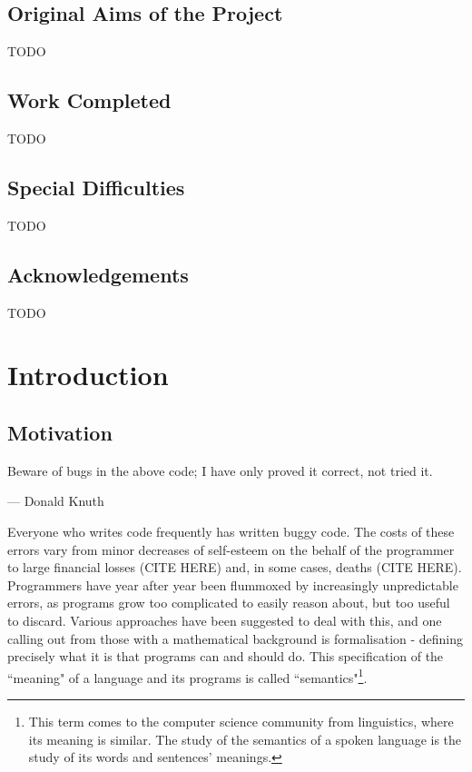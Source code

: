 \documentclass[12pt,a4paper,twoside,openright]{report}
\begin{document}
\section*{Original Aims of the Project}

TODO


\section*{Work Completed}

TODO

\section*{Special Difficulties}

TODO

\newpage

\tableofcontents

\listoffigures

\newpage
\section*{Acknowledgements}

TODO


\pagestyle{headings}
\chapter{Introduction}
\section{Motivation}
\epigraph{Beware of bugs in the above code; I have only proved it correct, not tried it.}{--- \textup{Donald Knuth}}

Everyone who writes code frequently has written buggy code. The costs of these errors vary from minor decreases of self-esteem on the behalf of the programmer to large financial losses (CITE HERE) and, in some cases, deaths (CITE HERE). Programmers have year after year been flummoxed by increasingly unpredictable errors, as programs grow too complicated to easily reason about, but too useful to discard. Various approaches have been suggested to deal with this, and one calling out from those with a mathematical background is formalisation - defining precisely what it is that programs can and should do. This specification of the ``meaning" of a language and its programs is called ``semantics"\footnote{This term comes to the computer science community from linguistics, where its meaning is similar. The study of the semantics of a spoken language is the study of its words and sentences' meanings.}. 
\end{document}
